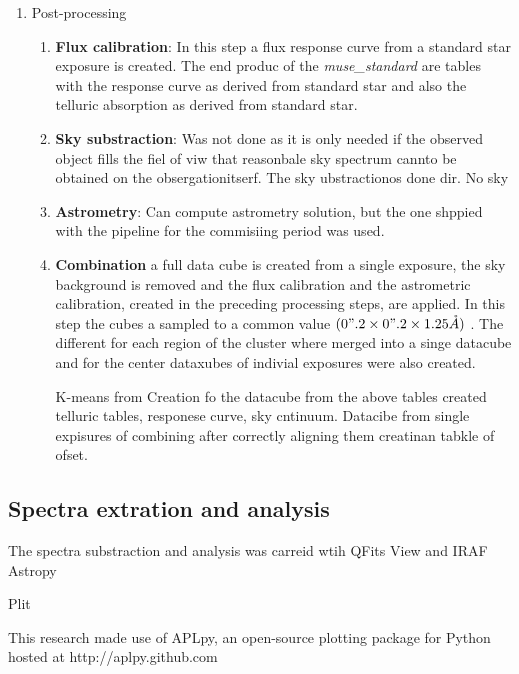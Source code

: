 \begin{enumerate}
\begin{enumerate}[I]
    \end{enumerate}
\item Post-processing
                \begin{enumerate}[I]
			\item \textbf{Flux calibration}:  In this step a flux response curve from a standard star exposure is created. The end produc of the \emph{muse\_standard} are tables with the response curve as derived from standard star and also the telluric absorption as derived from standard star.
                        \item \textbf{Sky substraction}: Was not done as it is only needed if the observed object fills the fiel of viw that reasonbale sky spectrum cannto be obtained on the obsergationitserf. The sky ubstractionos done dir. No sky  
                        \item \textbf{Astrometry}: Can compute astrometry solution, but the one shppied with the pipeline for the commisiing period was used. 
			\item \textbf{Combination} a full data cube is created from a single exposure, the sky background is removed and the flux calibration and the astrometric calibration, created in the preceding processing steps, are applied. In this step the cubes a sampled to a common value $(0".2 \times 0".2 \times 1.25 \mathring{A})$ . The different for each region of the cluster where merged into a singe datacube and for the center dataxubes of indivial exposures were also created.  
				
				K-means from Creation fo the datacube from the above tables created telluric tables, responese curve, sky cntinuum. Datacibe from single expisures of combining after correctly aligning them creatinan tabkle of ofset. 
                \end{enumerate}
\end{enumerate}


\subsection{Spectra extration and analysis}

The spectra substraction and analysis was carreid wtih QFits View and IRAF \citep{1986SPIE..627..733T}
Astropy \citep{astropy_collaboration_astropy_2013}

Plit

This research made use of APLpy, an open-source plotting package for Python hosted at http://aplpy.github.com

